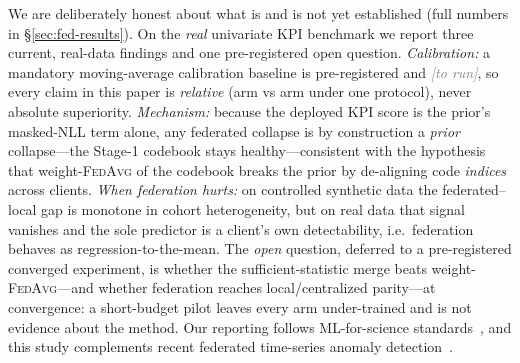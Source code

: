 \documentclass[11pt]{article}
\theoremstyle{plain}
\theoremstyle{definition}
\newcommand{\pending}{\textcolor{gray}{\emph{[to run]}}}
\begin{document}
We are deliberately honest about what is and is not yet established (full numbers in
\S\ref{sec:fed-results}). On the \emph{real} univariate KPI benchmark we report three
current, real-data findings and one pre-registered open question. \emph{Calibration:}
a mandatory moving-average calibration baseline is pre-registered and \pending, so every claim
in this paper is \emph{relative} (arm vs arm under one protocol), never absolute superiority.
\emph{Mechanism:} because the deployed KPI score is the prior's masked-NLL term alone,
any federated collapse is by construction a \emph{prior} collapse---the Stage-1 codebook
stays healthy---consistent with the hypothesis that weight-\textsc{FedAvg} of the codebook
breaks the prior by de-aligning code \emph{indices} across clients. \emph{When federation
hurts:} on controlled synthetic data the federated--local gap is monotone in cohort
heterogeneity, but on real data that signal vanishes and the sole predictor is a client's
own detectability, i.e.\ federation behaves as regression-to-the-mean. The \emph{open}
question, deferred to a pre-registered converged experiment, is whether the
sufficient-statistic merge beats weight-\textsc{FedAvg}---and whether federation reaches
local/centralized parity---at convergence: a short-budget pilot leaves every arm
under-trained and is not evidence about the method. Our reporting follows ML-for-science
standards~\cite{kapoor2024reforms}, and this study complements recent federated
time-series anomaly detection~\cite{perales2023temporalfed}.
\end{document}
